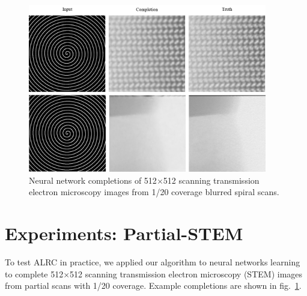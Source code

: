 \documentclass[letterpaper, 10 pt, conference]{ieeeconf}  %
\newcommand{\handlethispage}{}
\newcommand{\discardpagesfromhere}{\let\handlethispage\AtBeginShipoutDiscard}
\newcommand{\keeppagesfromhere}{\let\handlethispage\relax}
\begin{document}
\FloatBarrier
\discardpagesfromhere
\clearpage
\keeppagesfromhere

\begin{figure}[tbh]
\centering
\includegraphics[width=0.93\textwidth]{alrc_example.png}
\caption{ Neural network completions of 512$\times$512 scanning transmission electron microscopy images from 1/20 coverage blurred spiral scans. }
\label{alrc_example}
\end{figure}

\section{Experiments: Partial-STEM}

To test ALRC in practice, we applied our algorithm to neural networks learning to complete 512$\times$512 scanning transmission electron microscopy (STEM) images from partial scans with 1/20 coverage. Example completions are shown in fig.~\ref{alrc_example}.
\end{document}
